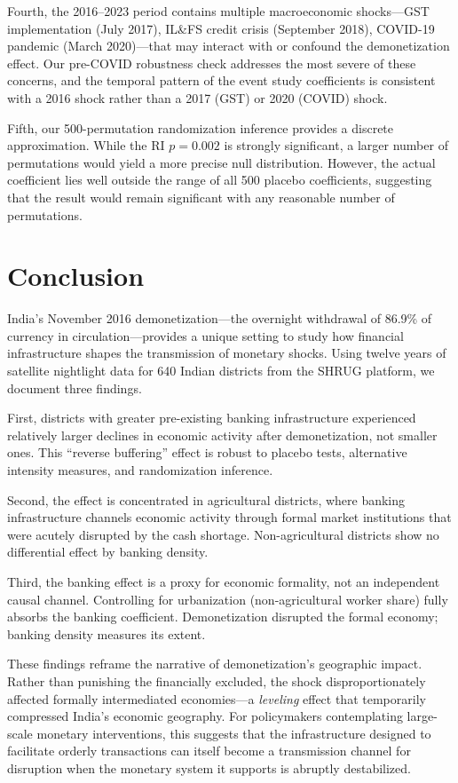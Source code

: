 \documentclass[12pt]{article}
\begin{document}
Fourth, the 2016--2023 period contains multiple macroeconomic shocks---GST implementation (July 2017), IL\&FS credit crisis (September 2018), COVID-19 pandemic (March 2020)---that may interact with or confound the demonetization effect. Our pre-COVID robustness check addresses the most severe of these concerns, and the temporal pattern of the event study coefficients is consistent with a 2016 shock rather than a 2017 (GST) or 2020 (COVID) shock.

Fifth, our 500-permutation randomization inference provides a discrete approximation. While the RI $p = 0.002$ is strongly significant, a larger number of permutations would yield a more precise null distribution. However, the actual coefficient lies well outside the range of all 500 placebo coefficients, suggesting that the result would remain significant with any reasonable number of permutations.


\section{Conclusion}\label{sec:conclusion}

India's November 2016 demonetization---the overnight withdrawal of 86.9\% of currency in circulation---provides a unique setting to study how financial infrastructure shapes the transmission of monetary shocks. Using twelve years of satellite nightlight data for 640 Indian districts from the SHRUG platform, we document three findings.

First, districts with greater pre-existing banking infrastructure experienced relatively larger declines in economic activity after demonetization, not smaller ones. This ``reverse buffering'' effect is robust to placebo tests, alternative intensity measures, and randomization inference.

Second, the effect is concentrated in agricultural districts, where banking infrastructure channels economic activity through formal market institutions that were acutely disrupted by the cash shortage. Non-agricultural districts show no differential effect by banking density.

Third, the banking effect is a proxy for economic formality, not an independent causal channel. Controlling for urbanization (non-agricultural worker share) fully absorbs the banking coefficient. Demonetization disrupted the formal economy; banking density measures its extent.

These findings reframe the narrative of demonetization's geographic impact. Rather than punishing the financially excluded, the shock disproportionately affected formally intermediated economies---a \textit{leveling} effect that temporarily compressed India's economic geography. For policymakers contemplating large-scale monetary interventions, this suggests that the infrastructure designed to facilitate orderly transactions can itself become a transmission channel for disruption when the monetary system it supports is abruptly destabilized.
\end{document}
